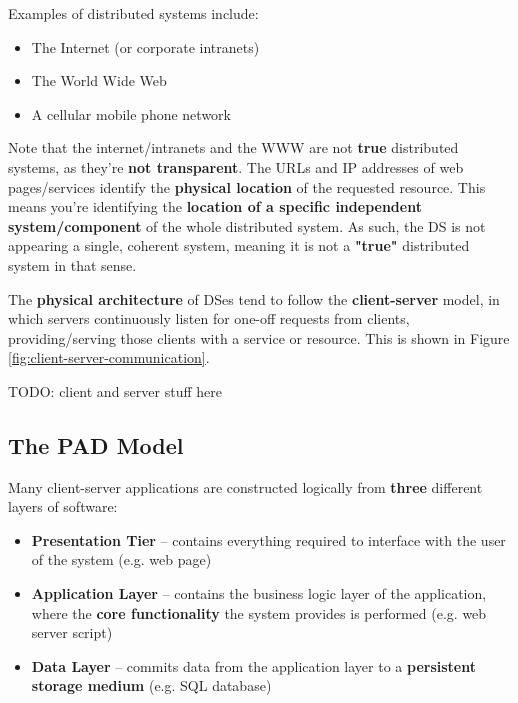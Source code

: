 \documentclass{article}
\begin{document}
Examples of distributed systems include:
\begin{itemize}
	\item The Internet (or corporate intranets)
	\item The World Wide Web
	\item A cellular mobile phone network
\end{itemize}

Note that the internet/intranets and the WWW are not \textbf{true} distributed systems, as they're \textbf{not transparent}. The URLs and IP addresses of web pages/services identify the \textbf{physical location} of the requested resource. This means you're identifying the \textbf{location of a specific independent system/component} of the whole distributed system. As such, the DS is not appearing a single, coherent system, meaning it is not a \textbf{"true"} distributed system in that sense.

The \textbf{physical architecture} of DSes tend to follow the \textbf{client-server} model, in which servers continuously listen for one-off requests from clients, providing/serving those clients with a service or resource. This is shown in Figure \ref{fig:client-server-communication}.

TODO: client and server stuff here

\subsection{The PAD Model}

Many client-server applications are constructed logically from \textbf{three} different layers of software:
\begin{itemize}
    \item \textbf{Presentation Tier} -- contains everything required to interface with the user of the system (e.g. web page)
    \item \textbf{Application Layer} -- contains the business logic layer of the application, where the \textbf{core functionality} the system provides is performed (e.g. web server script)
    \item \textbf{Data Layer} -- commits data from the application layer to a \textbf{persistent storage medium} (e.g. SQL database)
\end{itemize}
\end{document}
